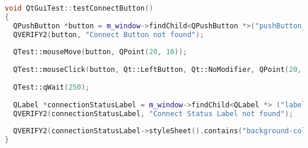		\begin{lstlisting}[language=C++, caption=qtguitest.cpp]
void QtGuiTest::testConnectButton()
{
  QPushButton *button = m_window->findChild<QPushButton *>("pushButton_connect");
  QVERIFY2(button, "Connect Button not found");
	
  QTest::mouseMove(button, QPoint(20, 10));
	
  QTest::mouseClick(button, Qt::LeftButton, Qt::NoModifier, QPoint(20, 10));
	
  QTest::qWait(250);
	
  QLabel *connectionStatusLabel = m_window->findChild<QLabel *> ("label_connectionStatus");
  QVERIFY2(connectionStatusLabel, "Connect Status Label not found");
	
  QVERIFY2(connectionStatusLabel->styleSheet().contains("background-color: rgb(27, 193, 00)"), "Color of label_connectionStatus is not Green");
}
		\end{lstlisting}
		
